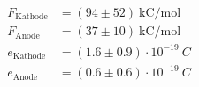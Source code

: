 \begin{align*}
F_\text{Kathode} &= (94 \pm 52)~\text{kC/mol}\\
F_\text{Anode} &= (37 \pm 10)~\text{kC/mol} \\
e_\text{Kathode} &= (1.6 \pm 0.9)\cdot 10^{-19}~C \\
e_\text{Anode} &= (0.6 \pm 0.6)\cdot 10^{-19}~C  
\end{align*}
